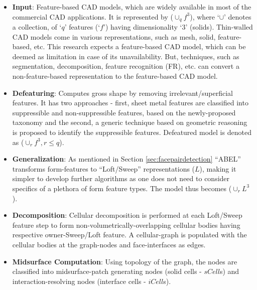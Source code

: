\begin{minipage}[c]{0.98\linewidth}
    \begin{minipage}[c]{0.57\linewidth}
\begin{itemize}[noitemsep,topsep=2pt,parsep=2pt,partopsep=2pt,leftmargin=*]
\item \textbf{Input}: Feature-based CAD models, which are widely available in most of the commercial CAD applications. It is represented by  ($\cup_qf^3$), where `$\cup$' denotes a collection, of `$q$' features (`$f$') having dimensionality `$3$' (solids). Thin-walled CAD models come in various representations, such as mesh, solid, feature-based, etc. This research expects a feature-based CAD model, which can be deemed as limitation in case of its unavailability. But, techniques, such as segmentation, decomposition, feature recognition (FR), etc. can convert a non-feature-based representation to the feature-based CAD model.

\item \textbf{Defeaturing}:  Computes gross shape by removing irrelevant/superficial features. It has two approaches - first, sheet metal features are classified into suppressible and non-suppressible features, based on the newly-proposed taxonomy and the second, a generic technique based on geometric reasoning is proposed to identify the suppressible features. Defeatured model  is denoted as ($\cup_rf^3, r \leq q$).%

\item \textbf{Generalization}: As mentioned in Section \ref{sec:facepairdetection} ``ABEL'' transforms form-features to ``Loft/Sweep'' representations ($L$), making it simpler to develop further algorithms as one does not need to consider specifics of a plethora of form feature types. The model thus becomes ($\cup_rL^3$).%

\item \textbf{Decomposition}: Cellular decomposition is performed at each Loft/Sweep feature step to form non-volumetrically-overlapping cellular bodies having respective owner-Sweep/Loft feature. A cellular-graph is populated with the cellular bodies at the graph-nodes and face-interfaces as edges.

\item \textbf{Midsurface Computation}: Using topology of the graph, the nodes are classified into midsurface-patch generating nodes (solid cells - $sCell$s) and interaction-resolving nodes (interface cells - $iCell$s). 


\end{itemize}
\end{minipage}
\end{minipage}
